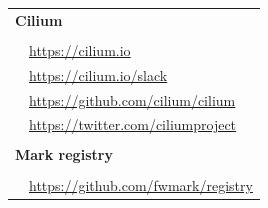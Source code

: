 \documentclass[black,white,aspectratio=169]{beamer}
\DeclareRobustCommand{\#}{\adjustbox{valign=B,totalheight=.57\baselineskip}{\oldhash}}%
\newcommand{\link}[1]{{\large\color{blue}\href{#1}{#1}}}
\begin{document}
    \begin{frame}[plain]{}
        \centering
        \vfill
        \begin{table}
            \begin{subtable}[l]{0.6\textwidth}
                \begin{tabular}{rl}
                    \multicolumn{2}{l}{\textbf{Cilium}} \\ \\
                    
                    & \link{https://cilium.io} \\
                    
                    & \link{https://cilium.io/slack} \\
                    
                    & \link{https://github.com/cilium/cilium} \\
                    
                    & \link{https://twitter.com/ciliumproject} \\ \\
                    \multicolumn{2}{l}{\textbf{Mark registry}} \\ \\
                    
                    & \link{https://github.com/fwmark/registry} \\
                \end{tabular}
            \end{subtable}
            \begin{subtable}[r]{0.3\textwidth}
                
            \end{subtable}
        \end{table}
        \vfill
    \end{frame}
\end{document}
